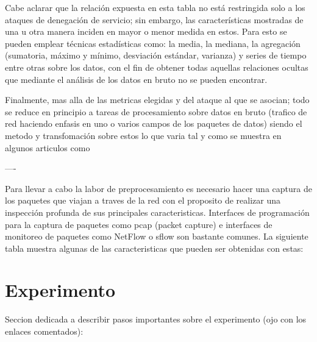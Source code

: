 \documentclass[12pt]{article}
\begin{document}
Cabe aclarar que la relación expuesta en esta tabla no está restringida solo a los ataques de denegación de servicio; sin embargo, las características mostradas de una u otra manera inciden en mayor o menor medida en estos. Para esto se pueden emplear técnicas estadísticas \citep{sans_ids_metrics} como: la media, la mediana, la agregación (sumatoria, máximo y mínimo, desviación estándar, varianza) y series de tiempo entre otras sobre los datos, con el fin de obtener todas aquellas relaciones ocultas que mediante el análisis de los datos en bruto no se pueden encontrar.  

Finalmente, mas alla de las metricas elegidas y del ataque al que se asocian; todo se reduce en principio a tareas de procesamiento sobre datos en bruto (trafico de red haciendo enfasis en uno o varios campos de los paquetes de datos) siendo el metodo y transfomación sobre estos lo que varia tal y como se muestra en algunos articulos como \citep{review_ddos_approaches,det_tech_ddos} 





----

Para llevar a cabo la labor de preprocesamiento es necesario hacer una captura de los paquetes que viajan a traves de la red con el proposito de realizar una inspección profunda de sus principales caracteristicas. Interfaces de programación para la captura de paquetes como pcap (packet capture) e interfaces de monitoreo de paquetes como NetFlow o sflow son bastante comunes. La siguiente tabla muestra algunas de las caracteristicas que pueden ser obtenidas con estas:

\section{Experimento}

Seccion dedicada a describir pasos importantes sobre el experimento (ojo con los enlaces comentados):


\end{document}
